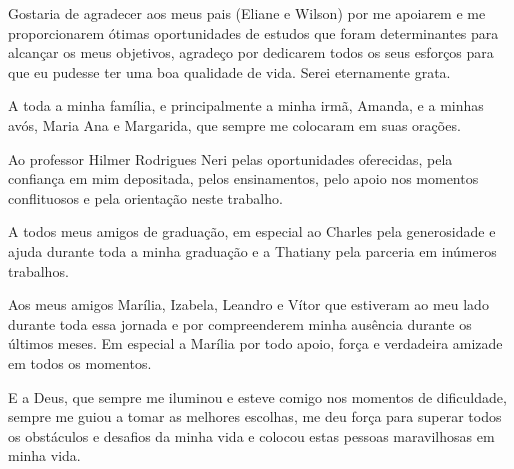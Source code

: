 \begin{agradecimentos}

Gostaria de agradecer aos meus pais (Eliane e Wilson) por me apoiarem e me proporcionarem ótimas oportunidades
de estudos que foram determinantes para alcançar os meus objetivos,  agradeço por dedicarem todos os seus esforços para que eu pudesse ter uma boa qualidade de vida.
Serei eternamente grata.

A toda a minha família, e principalmente a minha irmã, Amanda, e a minhas avós, Maria Ana e Margarida, que sempre me colocaram em suas orações.

Ao professor Hilmer Rodrigues Neri pelas oportunidades oferecidas, pela confiança em mim depositada, pelos ensinamentos, pelo apoio nos momentos conflituosos e pela orientação neste trabalho.

A todos meus amigos de graduação, em especial ao Charles pela generosidade e ajuda durante toda a minha graduação e a Thatiany pela parceria em inúmeros trabalhos.

Aos meus amigos Marília, Izabela, Leandro e Vítor que estiveram ao meu lado durante toda essa jornada e por compreenderem minha ausência durante os últimos meses. Em especial a Marília por todo apoio, força e verdadeira amizade em todos os momentos.

E a Deus, que sempre me iluminou e esteve comigo nos momentos de dificuldade, sempre me guiou a tomar as melhores escolhas, me deu força para superar todos os obstáculos e 
desafios da minha vida e colocou estas pessoas maravilhosas em minha vida.

\end{agradecimentos}
